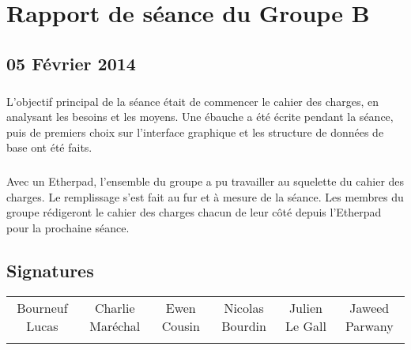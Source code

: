 
\newcommand{\titre}{Compte-rendu de séance}
\newcommand{\titrehead}{Compte-rendu de séance}













\chapter*{Rapport de séance du Groupe B}	
\section*{05 Février 2014}
    	\paragraph*{}
		L'objectif principal de la séance était de commencer le cahier des charges, en analysant les besoins et les moyens.
		Une ébauche a été écrite pendant la séance, puis de premiers choix sur l'interface graphique et les structure de données de base ont été faits.
    	\paragraph*{}
		Avec un Etherpad, l'ensemble du groupe a pu travailler au squelette du cahier des charges. Le remplissage s'est fait au fur et à mesure de la séance.
		Les membres du groupe rédigeront le cahier des charges chacun de leur côté depuis l'Etherpad pour la prochaine séance.


\section*{Signatures}

    	\begin{tabular*}{0.75\textwidth}{c | c | c | c | c | c}
    	    Bourneuf Lucas & Charlie Maréchal & Ewen Cousin & Nicolas Bourdin & Julien Le Gall & Jaweed Parwany\\
     	     & & & & &
    	\end{tabular*}




